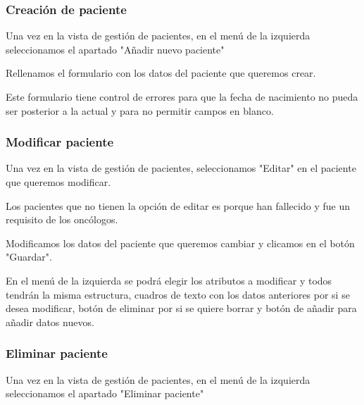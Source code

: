 
\subsubsection{Creación de paciente}

Una vez en la vista de gestión de pacientes, en el menú de la izquierda seleccionamos el apartado "{}Añadir nuevo paciente"


Rellenamos el formulario con los datos del paciente que queremos crear.


Este formulario tiene control de errores para que la fecha de nacimiento no pueda ser posterior a la actual y para no permitir campos en blanco.

\subsubsection{Modificar paciente}

Una vez en la vista de gestión de pacientes, seleccionamos "Editar" en el paciente que queremos modificar.

Los pacientes que no tienen la opción de editar es porque han fallecido y fue un requisito de los oncólogos.


Modificamos los datos del paciente que queremos cambiar y clicamos en el botón "{}Guardar". 


En el menú de la izquierda se podrá elegir los atributos a modificar y todos tendrán la misma estructura, cuadros de texto con los datos anteriores por si se desea modificar, botón de eliminar por si se quiere borrar y botón de añadir para añadir datos nuevos.


\subsubsection{Eliminar paciente}

Una vez en la vista de gestión de pacientes, en el menú de la izquierda seleccionamos el apartado "{}Eliminar paciente"

